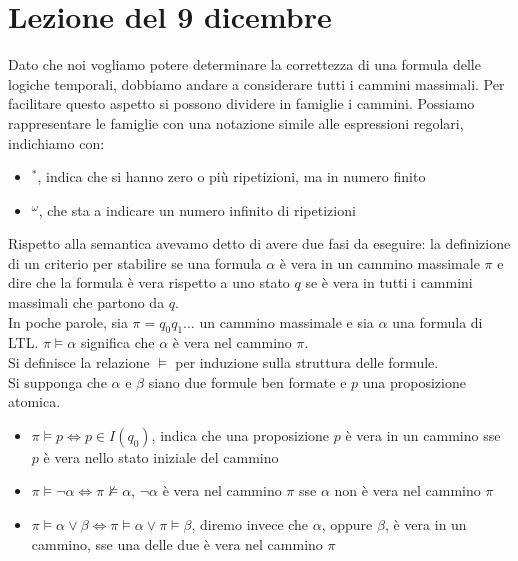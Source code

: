 \section{Lezione del 9 dicembre}
Dato che noi vogliamo potere determinare la correttezza di una formula delle logiche temporali, dobbiamo andare a considerare tutti i cammini massimali. Per facilitare questo aspetto si possono dividere in famiglie i cammini. Possiamo rappresentare le famiglie con una notazione simile alle espressioni regolari, indichiamo con:
\begin{itemize}
    \item $^*$, indica che si hanno zero o più ripetizioni, ma in numero finito 
    \item $^\omega$, che sta a indicare un numero infinito di ripetizioni 
\end{itemize}
Rispetto alla semantica avevamo detto di avere due fasi da eseguire: la definizione di un criterio per stabilire se una formula $\alpha$ è vera in un cammino massimale $\pi$ e dire che la formula è vera rispetto a uno stato $q$ se è vera in tutti i cammini massimali che partono da $q$.\\

In poche parole, sia $\pi = q_0 q_1 \dots$ un cammino massimale e sia $\alpha$ una formula di LTL. $\pi \vDash \alpha$ significa che $\alpha$ è vera nel cammino $\pi$.\\

Si definisce la relazione $\vDash$ per induzione sulla struttura delle formule.\\

Si supponga che $\alpha$ e $\beta$ siano due formule ben formate e $p$ una proposizione atomica.
\begin{itemize}
    \item $\pi \vDash p \Leftrightarrow p \in I(q_0)$, indica che una proposizione $p$ è vera in un cammino sse $p$ è vera nello stato iniziale del cammino
    \item $\pi \vDash \neg \alpha \Leftrightarrow \pi \nvDash \alpha$, $\neg \alpha$ è vera nel cammino $\pi$ sse $\alpha$ non è vera nel cammino $\pi$
    \item $\pi \vDash \alpha \lor \beta \Leftrightarrow \pi \vDash \alpha \lor \pi \vDash \beta$, diremo invece che $\alpha$, oppure $\beta$, è vera in un cammino, sse una delle due è vera nel cammino $\pi$
\end{itemize}
